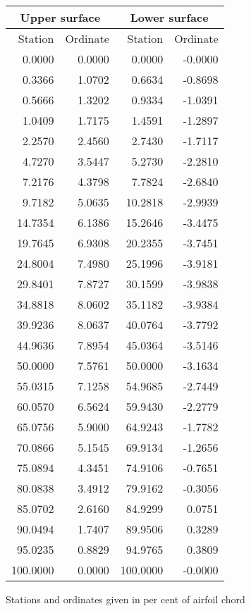 \documentclass[11pt]{book}
\begin{document}
 \hspace{4mm}
 \begin{tabular}{|r|r|r|r|} \hline 
 \multicolumn{2}{|c|}{Upper surface} & \multicolumn{2}{|c|}{Lower surface} \\
 \hline
 Station & Ordinate & Station & Ordinate \\
 \hline
0.0000 & 0.0000 & 0.0000 & -0.0000 \\
0.3366 & 1.0702 & 0.6634 & -0.8698 \\
0.5666 & 1.3202 & 0.9334 & -1.0391 \\
1.0409 & 1.7175 & 1.4591 & -1.2897 \\
2.2570 & 2.4560 & 2.7430 & -1.7117 \\
4.7270 & 3.5447 & 5.2730 & -2.2810 \\
7.2176 & 4.3798 & 7.7824 & -2.6840 \\
9.7182 & 5.0635 & 10.2818 & -2.9939 \\
14.7354 & 6.1386 & 15.2646 & -3.4475 \\
19.7645 & 6.9308 & 20.2355 & -3.7451 \\
24.8004 & 7.4980 & 25.1996 & -3.9181 \\
29.8401 & 7.8727 & 30.1599 & -3.9838 \\
34.8818 & 8.0602 & 35.1182 & -3.9384 \\
39.9236 & 8.0637 & 40.0764 & -3.7792 \\
44.9636 & 7.8954 & 45.0364 & -3.5146 \\
50.0000 & 7.5761 & 50.0000 & -3.1634 \\
55.0315 & 7.1258 & 54.9685 & -2.7449 \\
60.0570 & 6.5624 & 59.9430 & -2.2779 \\
65.0756 & 5.9000 & 64.9243 & -1.7782 \\
70.0866 & 5.1545 & 69.9134 & -1.2656 \\
75.0894 & 4.3451 & 74.9106 & -0.7651 \\
80.0838 & 3.4912 & 79.9162 & -0.3056 \\
85.0702 & 2.6160 & 84.9299 & 0.0751 \\
90.0494 & 1.7407 & 89.9506 & 0.3289 \\
95.0235 & 0.8829 & 94.9765 & 0.3809 \\
100.0000 & 0.0000 & 100.0000 & -0.0000 \\
 \hline 
 \end{tabular}
 \vspace{8mm}

Stations and ordinates given in per cent of airfoil chord
\end{document}
